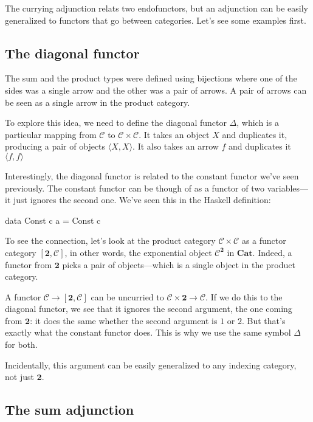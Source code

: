 \documentclass[DaoFP]{subfiles}
\begin{document}
The currying adjunction relats two endofunctors, but an adjunction can be easily generalized to functors that go between categories. Let's see some examples first.

\subsection{The diagonal functor}

The sum and the product types were defined using bijections where one of the sides was a single arrow and the other was a pair of arrows. A pair of arrows can be seen as a single arrow in the product category. 

To explore this idea, we need to define the diagonal functor $\Delta$, which is a particular mapping from $\mathcal{C}$ to $\mathcal{C} \times \mathcal{C}$. It takes an object $X$ and duplicates it, producing a pair of objects $\langle X, X \rangle$. It also takes an arrow $f$ and duplicates it $\langle f, f \rangle$

Interestingly, the diagonal functor is related to the constant functor we've seen previously. The constant functor can be though of as a functor of two variables---it just ignores the second one. We've seen this in the Haskell definition:
\begin{haskell}
data Const c a = Const c
\end{haskell}

To see the connection, let's look at the product category $\mathcal{C} \times \mathcal{C}$ as a functor category $[ \mathbf{2}, \mathcal{C}]$, in other words, the exponential object $\mathcal{C}^{ \mathbf{2}}$ in $\mathbf{Cat}$. Indeed, a functor from $\mathbf{2}$ picks a pair of objects---which is a single object in the product category.


A functor $\mathcal{C} \to [\mathbf{2}, \mathcal{C}]$ can be uncurried to $\mathcal{C} \times \mathbf{2} \to  \mathcal{C}$. If we do this to the diagonal functor, we see that it ignores the second argument, the one coming from $\mathbf{2}$: it does the same whether the second argument is $1$ or $2$. But that's exactly what the constant functor does. This is why we use the same symbol $\Delta$ for both.

Incidentally, this argument can be easily generalized to any indexing category, not just $\mathbf{2}$.

\subsection{The sum adjunction}
\end{document}
